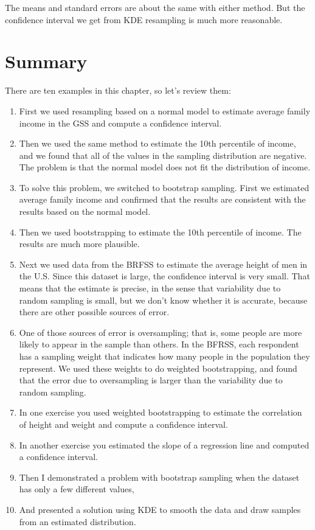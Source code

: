 The means and standard errors are about the same with either method. But
the confidence interval we get from KDE resampling is much more
reasonable.

\section{Summary}\label{summary}

There are ten examples in this chapter, so let's review them:

\begin{enumerate}
\def\labelenumi{\arabic{enumi}.}
\item
  First we used resampling based on a normal model to estimate average
  family income in the GSS and compute a confidence interval.
\item
  Then we used the same method to estimate the 10th percentile of
  income, and we found that all of the values in the sampling
  distribution are negative. The problem is that the normal model does
  not fit the distribution of income.
\item
  To solve this problem, we switched to bootstrap sampling. First we
  estimated average family income and confirmed that the results are
  consistent with the results based on the normal model.
\item
  Then we used bootstrapping to estimate the 10th percentile of income.
  The results are much more plausible.
\item
  Next we used data from the BRFSS to estimate the average height of men
  in the U.S. Since this dataset is large, the confidence interval is
  very small. That means that the estimate is precise, in the sense that
  variability due to random sampling is small, but we don't know whether
  it is accurate, because there are other possible sources of error.
\item
  One of those sources of error is oversampling; that is, some people
  are more likely to appear in the sample than others. In the BFRSS,
  each respondent has a sampling weight that indicates how many people
  in the population they represent. We used these weights to do weighted
  bootstrapping, and found that the error due to oversampling is larger
  than the variability due to random sampling.
\item
  In one exercise you used weighted bootstrapping to estimate the
  correlation of height and weight and compute a confidence interval.
\item
  In another exercise you estimated the slope of a regression line and
  computed a confidence interval.
\item
  Then I demonstrated a problem with bootstrap sampling when the dataset
  has only a few different values,
\item
  And presented a solution using KDE to smooth the data and draw samples
  from an estimated distribution.
\end{enumerate}

